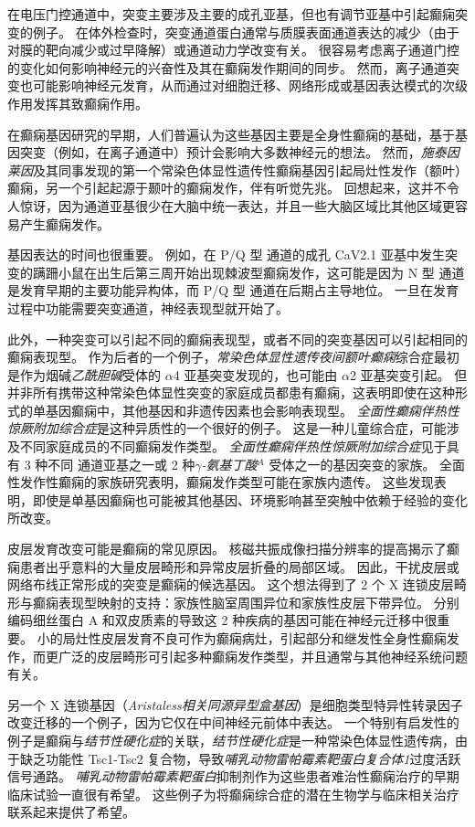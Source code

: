在电压门控通道中，突变主要涉及主要的成孔亚基，但也有调节亚基中引起癫痫突变的例子。
在体外检查时，突变通道蛋白通常与质膜表面通道表达的减少（由于对膜的靶向减少或过早降解）或通道动力学改变有关。
很容易考虑离子通道门控的变化如何影响神经元的兴奋性及其在癫痫发作期间的同步。
然而，离子通道突变也可能影响神经元发育，从而通过对细胞迁移、网络形成或基因表达模式的次级作用发挥其致癫痫作用。


在癫痫基因研究的早期，人们普遍认为这些基因主要是全身性癫痫的基础，基于基因突变（例如，在离子通道中）预计会影响大多数神经元的想法。
然而，\textit{施泰因莱因}及其同事发现的第一个常染色体显性遗传性癫痫基因引起局灶性发作（额叶）癫痫，另一个引起起源于颞叶的癫痫发作，伴有听觉先兆。
回想起来，这并不令人惊讶，因为通道亚基很少在大脑中统一表达，并且一些大脑区域比其他区域更容易产生癫痫发作。


基因表达的时间也很重要。
例如，在 P/Q 型  通道的成孔 CaV2.1 亚基中发生突变的蹒跚小鼠在出生后第三周开始出现棘波型癫痫发作，这可能是因为 N 型  通道是发育早期的主要功能异构体，而 P/Q 型  通道在后期占主导地位。
一旦在发育过程中功能需要突变通道，神经表现型就开始了。


此外，一种突变可以引起不同的癫痫表现型，或者不同的突变基因可以引起相同的癫痫表现型。
作为后者的一个例子，\textit{常染色体显性遗传夜间额叶癫痫}综合症最初是作为烟碱\textit{乙酰胆碱}受体的 $\alpha$4 亚基突变发现的，也可能由 $\alpha$2 亚基突变引起。
但并非所有携带这种常染色体显性突变的家庭成员都患有癫痫，这表明即使在这种形式的单基因癫痫中，其他基因和非遗传因素也会影响表现型。
\textit{全面性癫痫伴热性惊厥附加综合症}是这种异质性的一个很好的例子。 这是一种儿童综合症，可能涉及不同家庭成员的不同癫痫发作类型。
\textit{全面性癫痫伴热性惊厥附加综合症}见于具有 3 种不同  通道亚基之一或 2 种\textit{$\gamma$-氨基丁酸}$^A$ 受体之一的基因突变的家族。
全面性发作性癫痫的家族研究表明，癫痫发作类型可能在家族内遗传。
这些发现表明，即使是单基因癫痫也可能被其他基因、环境影响甚至突触中依赖于经验的变化所改变。


皮层发育改变可能是癫痫的常见原因。
核磁共振成像扫描分辨率的提高揭示了癫痫患者出乎意料的大量皮层畸形和异常皮层折叠的局部区域。
因此，干扰皮层或网络布线正常形成的突变是癫痫的候选基因。
这个想法得到了 2 个 X 连锁皮层畸形与癫痫表现型映射的支持：家族性脑室周围异位和家族性皮层下带异位。
分别编码细丝蛋白 A 和双皮质素的导致这 2 种疾病的基因可能在神经元迁移中很重要。
小的局灶性皮层发育不良可作为癫痫病灶，引起部分和继发性全身性癫痫发作，而更广泛的皮层畸形可引起多种癫痫发作类型，并且通常与其他神经系统问题有关。


另一个 X 连锁基因（\textit{Aristaless相关同源异型盒基因}）是细胞类型特异性转录因子改变迁移的一个例子，因为它仅在中间神经元前体中表达。
一个特别有启发性的例子是癫痫与\textit{结节性硬化症}的关联，\textit{结节性硬化症}是一种常染色体显性遗传病，由于缺乏功能性 Tsc1-Tsc2 复合物，导致\textit{哺乳动物雷帕霉素靶蛋白复合体1}过度活跃信号通路。
\textit{哺乳动物雷帕霉素靶蛋白}抑制剂作为这些患者难治性癫痫治疗的早期临床试验一直很有希望。
这些例子为将癫痫综合症的潜在生物学与临床相关治疗联系起来提供了希望。


